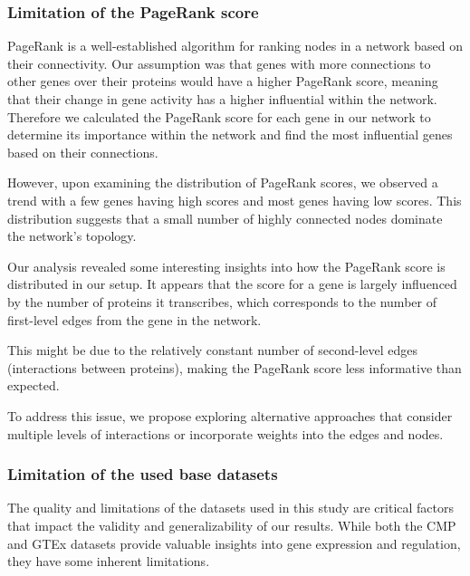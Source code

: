\subsubsection*{Limitation of the PageRank score} \label{subsubsec:limit_pagerank}
PageRank is a well-established algorithm for ranking nodes in a network based on their connectivity.
Our assumption was that genes with more connections to other genes over their proteins would have a higher PageRank score,
meaning that their change in gene activity has a higher influential within the network.
Therefore we calculated the PageRank score for each gene in our network to determine its importance within the network
and find the most influential genes based on their connections.


However, upon examining the distribution of PageRank scores, we observed a trend with a few genes having high scores
and most genes having low scores.
This distribution suggests that a small number of highly connected nodes dominate the network's topology.

Our analysis revealed some interesting insights into how the PageRank score is distributed in our setup.
It appears that the score for a gene is largely influenced by the number of proteins it transcribes,
which corresponds to the number of first-level edges from the gene in the network.

This might be due to the relatively constant number of second-level edges (interactions between proteins),
making the PageRank score less informative than expected.

To address this issue, we propose exploring alternative approaches that consider multiple levels of interactions
or incorporate weights into the edges and nodes.

\subsubsection*{Limitation of the used base datasets} \label{subsubsec:limit_base_data}

The quality and limitations of the datasets used in this study are critical factors that impact the validity and generalizability of our results.
While both the CMP and GTEx datasets provide valuable insights into gene expression and regulation,
they have some inherent limitations.

